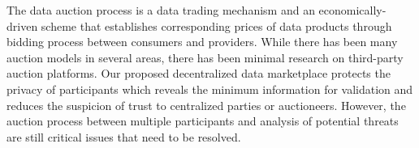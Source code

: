 \documentclass[conference]{IEEEtran}
\begin{document}
The data auction process is a data trading mechanism and an economically-driven scheme that establishes corresponding prices of data products through bidding process between consumers and providers. While there has been many auction models\cite{BigPicDataMarket} in several areas, there has been minimal research on third-party auction platforms. Our proposed decentralized data marketplace protects the privacy of participants which reveals the minimum information for validation and reduces the suspicion of trust to centralized parties or auctioneers. However, the auction process between multiple participants and analysis of potential threats are still critical issues that need to be resolved.




\end{document}
